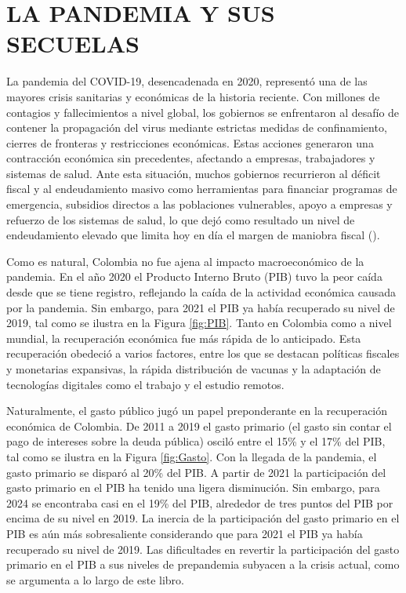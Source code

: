 \chapter{LA PANDEMIA Y SUS SECUELAS}\label{chap:antecedentes}

La pandemia del COVID-19, desencadenada en 2020, representó una de las mayores crisis sanitarias y económicas de la historia reciente. Con millones de contagios y fallecimientos a nivel global, los gobiernos se enfrentaron al desafío de contener la propagación del virus mediante estrictas medidas de confinamiento, cierres de fronteras y restricciones económicas. Estas acciones generaron una contracción económica sin precedentes, afectando a empresas, trabajadores y sistemas de salud. Ante esta situación, muchos gobiernos recurrieron al déficit fiscal y al endeudamiento masivo como herramientas para financiar programas de emergencia, subsidios directos a las poblaciones vulnerables, apoyo a empresas y refuerzo de los sistemas de salud, lo que dejó como resultado un nivel de endeudamiento elevado que limita hoy en día el margen de maniobra fiscal (\cite{IMFGlobalDebt2021}).



Como es natural, Colombia no fue ajena al impacto macroeconómico de la pandemia. En el año 2020 el Producto Interno Bruto (PIB) tuvo la peor caída desde que se tiene registro, reflejando la caída de la actividad económica causada por la pandemia. Sin embargo, para 2021 el PIB ya había recuperado su nivel de 2019, tal como se ilustra en la Figura \ref{fig:PIB}. Tanto en Colombia como a nivel mundial, la recuperación económica fue más rápida de lo anticipado. Esta recuperación obedeció a varios factores, entre los que se destacan políticas fiscales y monetarias expansivas, la rápida distribución de vacunas y la adaptación de tecnologías digitales como el trabajo y el estudio remotos.




Naturalmente, el gasto público jugó un papel preponderante en la recuperación económica de Colombia. De 2011 a 2019 el gasto primario (el gasto sin contar el pago de intereses sobre la deuda pública) osciló entre el 15\% y el 17\% del PIB, tal como se ilustra en la Figura \ref{fig:Gasto}. Con la llegada de la pandemia, el gasto primario se disparó al 20\% del PIB. A partir de 2021 la participación del gasto primario en el PIB ha tenido una ligera disminución. Sin embargo, para 2024 se encontraba casi en el 19\% del PIB, alrededor de tres puntos del PIB por encima de su nivel en 2019. La inercia de la participación del gasto primario en el PIB es aún más sobresaliente considerando que para 2021 el PIB ya había recuperado su nivel de 2019. Las dificultades en revertir la participación del gasto primario en el PIB a sus niveles de prepandemia subyacen a la crisis actual, como se argumenta a lo largo de este libro.

